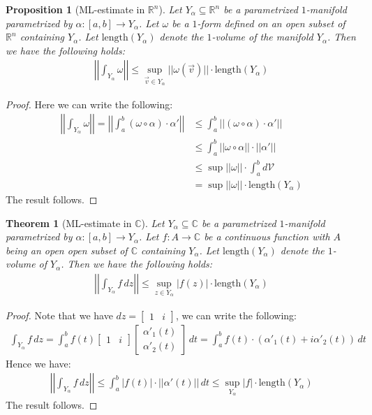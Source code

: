 \documentclass[15pt]{book}
\theoremstyle{break}
\theoremstyle{break}
\newtheorem{thm}{Theorem}[section]
\newtheorem{prop}[lem]{Proposition}
\newcommand{\R}{\mathbb{R}}
\newcommand{\Complex}{\mathbb{C}}
\newcommand{\bmat}[1]{\begin{bmatrix} #1 \end{bmatrix}}
\begin{document}
\begin{prop}[ML-estimate in $\R^n$]
Let $Y_\alpha \subseteq \R^n$ be a parametrized $1$-manifold parametrized by $\alpha:[a,b] \to Y_\alpha$. Let $\omega$ be a $1$-form defined on an open subset of $\R^n$ containing $Y_\alpha$. Let $\text{length}(Y_\alpha)$ denote the $1$-volume of the manifold $Y_\alpha$. Then we have the following holds:
\begin{align*}
\left|\left|\int_{Y_\alpha} \omega \right|\right| \leq \sup_{\vec{v}\in Y_\alpha}||\omega(\vec{v})|| \cdot \text{length}(Y_\alpha)
\end{align*}
\end{prop}
\begin{proof}
Here we can write the following:
\begin{align*}
\left|\left|\int_{Y_\alpha} \omega \right|\right|= \left|\left|\int_a^b (\omega\circ \alpha) \cdot \alpha' \right|\right|
&\leq \int_a^b ||(\omega\circ \alpha) \cdot \alpha'||\\
&\leq \int_a^b ||\omega\circ \alpha|| \cdot ||\alpha'||\\
&\leq \sup||\omega|| \cdot \int_a^b d\mathcal{V}\\
&= \sup||\omega|| \cdot \text{length}(Y_\alpha)
\end{align*}
The result follows.
\end{proof}


\begin{thm}[ML-estimate in $\Complex$]
Let $Y_\alpha \subseteq \Complex$ be a parametrized $1$-manifold parametrized by $\alpha:[a,b] \to Y_\alpha$. Let $f:A \to \Complex$ be a continuous function with $A$ being an open open subset of $\Complex$ containing $Y_\alpha$. Let $\text{length}(Y_\alpha)$ denote the $1$-volume of $Y_\alpha$. Then we have the following holds:
\begin{align*}
\left|\left|\int_{Y_\alpha} f\, dz \right|\right| \leq \sup_{z \in Y_\alpha} |f(z)| \cdot \text{length}(Y_\alpha)
\end{align*}
\end{thm}
\begin{proof}
Note that we have $dz = \bmat{1&i}$, we can write the following:
\begin{align*}
\int_{Y_\alpha} f\, dz = \int_a^b f(t) \bmat{1 & i} \bmat{\alpha'_1(t) \\ \alpha'_2(t)} \, dt = \int_a^b f(t)\cdot (\alpha'_1(t) + i \alpha'_2(t))\, dt
\end{align*}
Hence we have:
\begin{align*}
\left|\left|\int_{Y_\alpha} f\, dz\right|\right| \leq \int_a^b |f(t)|\cdot ||\alpha'(t)||\, dt \leq \sup_{Y_\alpha} |f| \cdot \text{length}(Y_\alpha)
\end{align*}
The result follows.
\end{proof}
\end{document}
